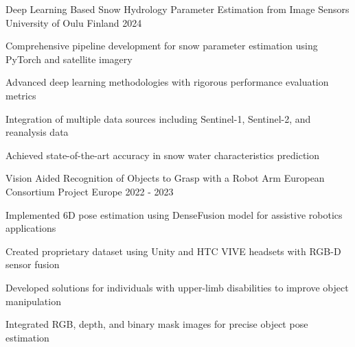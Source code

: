 
\begin{cventries}

  \cventry
    {Deep Learning Based Snow Hydrology Parameter Estimation from Image Sensors} %
    {University of Oulu} %
    {Finland} %
    {2024} %
    {
      \begin{cvitems}
        \item {Comprehensive pipeline development for snow parameter estimation using PyTorch and satellite imagery}
        \item {Advanced deep learning methodologies with rigorous performance evaluation metrics}
        \item {Integration of multiple data sources including Sentinel-1, Sentinel-2, and reanalysis data}
        \item {Achieved state-of-the-art accuracy in snow water characteristics prediction}
      \end{cvitems}
    }

  \cventry
    {Vision Aided Recognition of Objects to Grasp with a Robot Arm} %
    {European Consortium Project} %
    {Europe} %
    {2022 - 2023} %
    {
      \begin{cvitems}
        \item {Implemented 6D pose estimation using DenseFusion model for assistive robotics applications}
        \item {Created proprietary dataset using Unity and HTC VIVE headsets with RGB-D sensor fusion}
        \item {Developed solutions for individuals with upper-limb disabilities to improve object manipulation}
        \item {Integrated RGB, depth, and binary mask images for precise object pose estimation}
      \end{cvitems}
    }


\end{cventries}
